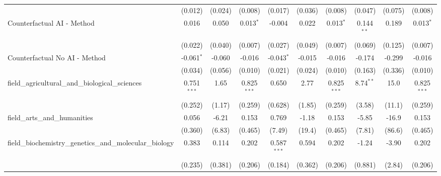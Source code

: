 \begin{tabular}{lccccccccc}
                                                               & (0.012)       & (0.024)       & (0.008)        & (0.017)       & (0.036)      & (0.008)        & (0.047)      & (0.075)      & (0.008)\\   
   Counterfactual AI - Method                                  & 0.016         & 0.050         & 0.013$^{*}$    & -0.004        & 0.022        & 0.013$^{*}$    & 0.144$^{**}$ & 0.189        & 0.013$^{*}$\\   
                                                               & (0.022)       & (0.040)       & (0.007)        & (0.027)       & (0.049)      & (0.007)        & (0.069)      & (0.125)      & (0.007)\\   
   Counterfactual No AI - Method                               & -0.061$^{*}$  & -0.060        & -0.016         & -0.043$^{*}$  & -0.015       & -0.016         & -0.174       & -0.299       & -0.016\\   
                                                               & (0.034)       & (0.056)       & (0.010)        & (0.021)       & (0.024)      & (0.010)        & (0.163)      & (0.336)      & (0.010)\\   
   field\_agricultural\_and\_biological\_sciences              & 0.751$^{***}$ & 1.65          & 0.825$^{***}$  & 0.650         & 2.77         & 0.825$^{***}$  & 8.74$^{**}$  & 15.0         & 0.825$^{***}$\\   
                                                               & (0.252)       & (1.17)        & (0.259)        & (0.628)       & (1.85)       & (0.259)        & (3.58)       & (11.1)       & (0.259)\\   
   field\_arts\_and\_humanities                                & 0.056         & -6.21         & 0.153          & 0.769         & -1.18        & 0.153          & -5.85        & -16.9        & 0.153\\   
                                                               & (0.360)       & (6.83)        & (0.465)        & (7.49)        & (19.4)       & (0.465)        & (7.81)       & (86.6)       & (0.465)\\   
   field\_biochemistry\_genetics\_and\_molecular\_biology      & 0.383         & 0.114         & 0.202          & 0.587$^{***}$ & 0.594        & 0.202          & -1.24        & -3.90        & 0.202\\   
                                                               & (0.235)       & (0.381)       & (0.206)        & (0.184)       & (0.362)      & (0.206)        & (0.881)      & (2.84)       & (0.206)\\   

\end{tabular}
